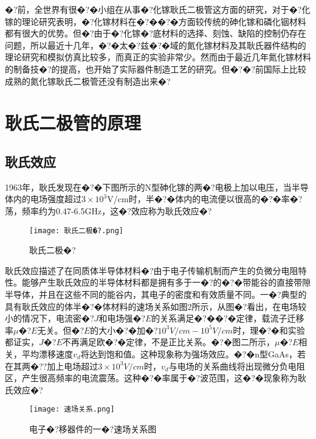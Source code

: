 \documentclass{zjureport}
\begin{document}
	�?前，全世界有很�?�小组在从事�?化镓耿氏二极管这方面的研究，对于�?化镓的理论研究表明，�?化镓材料在�?��?�方面较传统的砷化镓和磷化铟材料都有很大的优势。但�?由于�?化镓�?底材料的选择、刻蚀、缺陷的控制仍存在问题，所以最近十几年，�?�太�?兹�?�域的氮化镓材料及其耿氏器件结构的理论研究和模拟仿真比较多，而真正的实验非常少。然而由于最近几年氮化镓材料的制备技�?的提高，也开始了实际器件制造工艺的研究。但�?�?前国际上比较成熟的氮化镓耿氏二极管还没有制造出来�?
\section{耿氏二极管的原理}
\subsection{耿氏效应}
 1963年，耿氏发现在�?�下图所示的N型砷化镓的两�?电极上加以电压，当半导体内的电场强度超过$3×10^{3}$V/cm时，半�?�体内的电流便以很高的�?�率�?荡，频率约为0.47-6.5GHz，这�?效应称为耿氏效应�?
 \begin{figure}[htbp]
 	\centering
 	\texttt{[image: 耿氏二极�?.png]}
 	\caption{耿氏二极�?}
 \end{figure}
 
 耿氏效应描述了在同质体半导体材料�?由于电子传输机制而产生的负微分电阻特性。能够产生耿氏效应的半导体材料都是拥有多于一�?的�?�带能谷的直接带隙半导体，并且在这些不同的能谷内，其电子的密度和有效质量不同。一�?典型的具有耿氏效应的体半�?�体材料的速场关系如图2所示，从图�?看出，在电场较小的情况下，电流密�?$J$和电场强�?$E$的关系满足�?��?�定律，载流子迁移率$\mu$�?$E$无关。但�?$E$的大小�?�加�?$10^{3}V/cm-10^{5}V/cm$时，理�?�和实验都证实，$J$�?$E$不再满足欧�?�定律，不是正比关系。�?�图二所示，$ \mu $�?$ E $相关，平均漂移速度$v_{d}$将达到饱和值。这种现象称为强场效应。�?�n型GaAs，若在其两�??加上电场超过$3×10^{3}V/cm$时，$v_{d}$与电场的关系曲线将出现微分负电阻区，产生很高频率的电流震荡。这种�?�率属于�?波范围，这�?�现象称为耿氏效应�?
 
  \begin{figure}[htbp]
 	\centering
 	\texttt{[image: 速场关系.png]}
 	\caption{电子�?移器件的一�?速场关系图}
 \end{figure}
 
\end{document}
